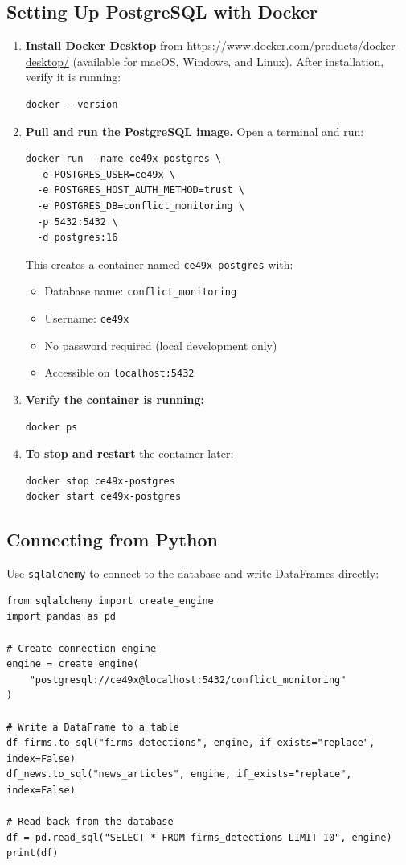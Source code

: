 \documentclass[11pt]{article}
\begin{document}
\subsection{Setting Up PostgreSQL with Docker}
\begin{enumerate}
  \item \textbf{Install Docker Desktop} from \url{https://www.docker.com/products/docker-desktop/} (available for macOS, Windows, and Linux). After installation, verify it is running:
\begin{lstlisting}[style=shell]
docker --version
\end{lstlisting}

  \item \textbf{Pull and run the PostgreSQL image.} Open a terminal and run:
\begin{lstlisting}[style=shell]
docker run --name ce49x-postgres \
  -e POSTGRES_USER=ce49x \
  -e POSTGRES_HOST_AUTH_METHOD=trust \
  -e POSTGRES_DB=conflict_monitoring \
  -p 5432:5432 \
  -d postgres:16
\end{lstlisting}

  This creates a container named \texttt{ce49x-postgres} with:
  \begin{itemize}
    \item Database name: \texttt{conflict\_monitoring}
    \item Username: \texttt{ce49x}
    \item No password required (local development only)
    \item Accessible on \texttt{localhost:5432}
  \end{itemize}

  \item \textbf{Verify the container is running:}
\begin{lstlisting}[style=shell]
docker ps
\end{lstlisting}

  \item \textbf{To stop and restart} the container later:
\begin{lstlisting}[style=shell]
docker stop ce49x-postgres
docker start ce49x-postgres
\end{lstlisting}
\end{enumerate}

\subsection{Connecting from Python}
Use \texttt{sqlalchemy} to connect to the database and write DataFrames directly:
\begin{lstlisting}[style=python]
from sqlalchemy import create_engine
import pandas as pd

# Create connection engine
engine = create_engine(
    "postgresql://ce49x@localhost:5432/conflict_monitoring"
)

# Write a DataFrame to a table
df_firms.to_sql("firms_detections", engine, if_exists="replace", index=False)
df_news.to_sql("news_articles", engine, if_exists="replace", index=False)

# Read back from the database
df = pd.read_sql("SELECT * FROM firms_detections LIMIT 10", engine)
print(df)
\end{lstlisting}
\end{document}
